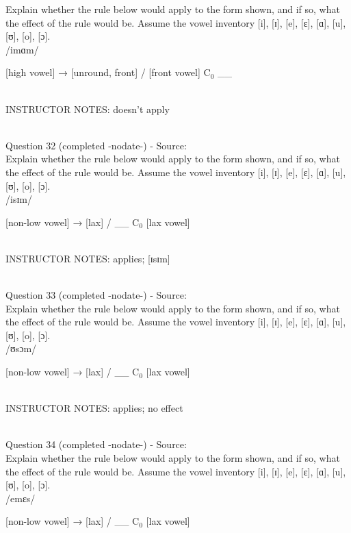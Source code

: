 \documentclass[12pt]{article}
\begin{document}
Explain whether the rule below would apply to the form shown, and if so, what the effect of the rule would be. Assume the vowel inventory [i], [ɪ], [e], [ɛ], [ɑ], [u], [ʊ], [o], [ɔ].\\

/imɑm/

{[high vowel]} →  {[unround, front]} / {[front vowel]} C$_0$ \_\_ 


~\\
INSTRUCTOR NOTES: doesn't apply


~\\

{\large Question 32} (completed -nodate-) - Source: \\

Explain whether the rule below would apply to the form shown, and if so, what the effect of the rule would be. Assume the vowel inventory [i], [ɪ], [e], [ɛ], [ɑ], [u], [ʊ], [o], [ɔ].\\

/isɪm/

{[non-low vowel]} →  {[lax]} / \_\_ C$_0$ {[lax vowel]}


~\\
INSTRUCTOR NOTES: applies; [ɪsɪm]


~\\

{\large Question 33} (completed -nodate-) - Source: \\

Explain whether the rule below would apply to the form shown, and if so, what the effect of the rule would be. Assume the vowel inventory [i], [ɪ], [e], [ɛ], [ɑ], [u], [ʊ], [o], [ɔ].\\

/ʊsɔm/

{[non-low vowel]} →  {[lax]} / \_\_ C$_0$ {[lax vowel]}


~\\
INSTRUCTOR NOTES: applies; no effect


~\\

{\large Question 34} (completed -nodate-) - Source: \\

Explain whether the rule below would apply to the form shown, and if so, what the effect of the rule would be. Assume the vowel inventory [i], [ɪ], [e], [ɛ], [ɑ], [u], [ʊ], [o], [ɔ].\\

/emɛs/

{[non-low vowel]} →  {[lax]} / \_\_ C$_0$ {[lax vowel]}
\end{document}
